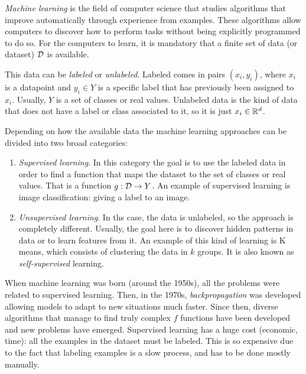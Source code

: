 \label{Chapter:Intro:Rep:Learning}

\emph{Machine learning} is the field of computer science that studies algorithms that improve automatically through experience from examples. 
These algorithms allow computers to discover how to
perform tasks without being explicitly programmed to do so. For the computers to learn, it is mandatory that a finite set of data (or dataset) $\mathcal{D}$ is available. 

This data can be \emph{labeled} or \emph{unlabeled}. Labeled comes in pairs $(x_i,y_i)$, where $x_i$ is a datapoint and $y_i \in Y$ is a specific label that has previously been assigned to $x_i$. Usually, $Y$ is a set of classes or real values.
Unlabeled data is the kind of data that does not have a label or class associated to it, so it is just $x_i \in \mathbb{R}^d$. 

Depending on how the available data the machine learning approaches can be divided into two broad categories:
\begin{enumerate}
    \item \emph{Supervised learning}. In this category the goal is to use the labeled data in order to find a function that maps the dataset to the set of classes or real values. That is a function $g:\mathcal{D} \to Y$. 
    An example of supervised learning is image classification: giving a label to an image.
    \item \emph{Unsupervised learning}. In ths case, the data is unlabeled, so the approach is completely different. Usually, the goal here is to discover hidden patterns in data or to learn features from it.
    An example of this kind of learning is K means, which consists of clustering the data in $k$ groups. It is also known as \emph{self-supervised} learning.

\end{enumerate}

When machine learning was born (around the 1950s), all the problems were related to supervised learning. Then, in the 1970s, \emph{backpropagation} was developed allowing models to adapt to new situations much faster. Since then, diverse algorithms that manage to find truly complex $f$ functions have been developed and new problems have emerged. Supervised learning has a huge cost (economic, time): all the examples in the dataset must be labeled. This is so expensive due to the fact that labeling examples is a slow process, and has to be done mostly manually. 

